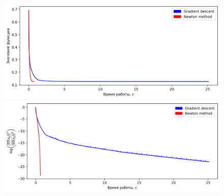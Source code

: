 \documentclass[notitlepage]{article}
\begin{document}
\begin{figure}[ht]
\begin{minipage}[t]{.5\textwidth}
  \centering
  \includegraphics[width=\textwidth, keepaspectratio]{plots/w8a_plot_func.png}
\end{minipage}
\begin{minipage}[t]{.5\textwidth}
  \centering
  \includegraphics[width=\textwidth, keepaspectratio]{plots/w8a_plot_grad.png}
\end{minipage}
\end{figure}
\end{document}
